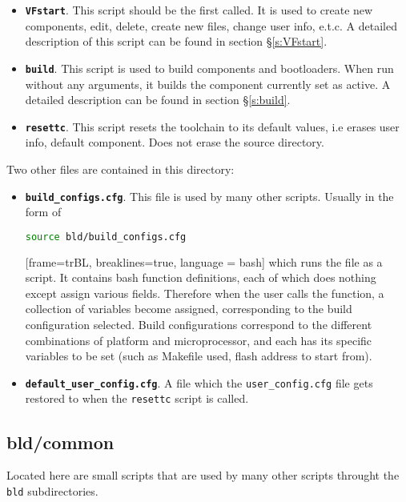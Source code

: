 \documentclass[a4paper, oneside, 11pt, titlepage, onecolumn, openright]{report}
\begin{document}
\begin{itemize}
			\label{bldscripts}
\item \label{VFstartsummary}\textbf{\texttt{VFstart}}. This script should be the first called. It is used to create new components, edit, delete, create new files, change user info, e.t.c. A detailed description of this script can be found in section \S\ref{s:VFstart}.

\item \label{buildsummary}\textbf{\texttt{build}}. This script is used to build components and bootloaders. When run without any arguments, it builds the component currently set as active.  A detailed description can be found in section \S\ref{s:build}.

\item \label{resettcsummary}\textbf{\texttt{resettc}}. This script resets the toolchain to its default values, i.e erases user info, default component. Does not erase the source directory.

\end{itemize}

Two other files are contained in this directory: 

\begin{itemize}

\item \textbf{\texttt{build\_configs.cfg}}. This file is used by many other scripts. Usually in the form of 
\begin{lstlisting}[frame=trBL, breaklines=true, language = bash]
source bld/build_configs.cfg
\end{lstlisting}[frame=trBL, breaklines=true, language = bash]
which runs the file as a script. It contains bash function definitions, each of which does nothing except assign various fields. Therefore when the user calls the function, a collection of variables become assigned, corresponding to the build configuration selected. Build configurations correspond to the different combinations of platform and microprocessor, and each has its specific variables to be set (such as Makefile used, flash address to start from).

\item \textbf{\texttt{default\_user\_config.cfg}}. A file which the \texttt{user\_config.cfg} file gets restored to when the \texttt{resettc} script is called.

\end{itemize}


\subsection{bld/common}
			\label{ss:bld/common}
			Located here are small scripts that are used by many other scripts throught the \texttt{bld} subdirectories. 
			
\end{document}
